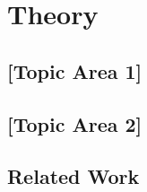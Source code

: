 \chapter{Theory}
\label{chap:theory}



\section{[Topic Area 1]}
\label{sec:topic1}


\section{[Topic Area 2]}
\label{sec:topic2}


\section{Related Work}
\label{sec:related-work}
